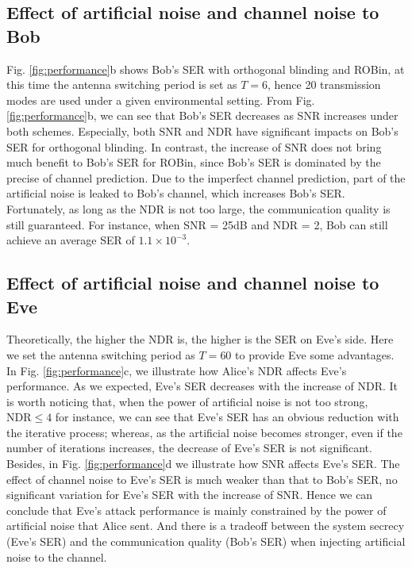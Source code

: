 \subsection{Effect of artificial noise and channel noise to Bob}
Fig. \ref{fig:performance}b shows Bob's SER with orthogonal blinding and ROBin, at this time the antenna switching period is set as $T = 6$, hence 20 transmission modes are used under a given environmental setting. From Fig. \ref{fig:performance}b, we can see that Bob's SER decreases as SNR increases under both schemes. Especially, both SNR and NDR have significant impacts on Bob's SER for orthogonal blinding. In contrast, the increase of SNR does not bring much benefit to Bob's SER for ROBin, since Bob's SER is dominated by the precise of channel prediction. Due to the imperfect channel prediction, part of the artificial noise is leaked to Bob's channel, which increases Bob's SER. Fortunately, as long as the NDR is not too large, the communication quality is still guaranteed. For instance, when SNR = 25dB and NDR = 2, Bob can still achieve an average SER of $1.1 \times 10^{-3}$. 

\subsection{Effect of artificial noise and channel noise to Eve}
Theoretically, the higher the NDR is, the higher is the SER on Eve's side. Here we set the antenna switching period as $T = 60$ to provide Eve some advantages. In Fig. \ref{fig:performance}c, we illustrate how Alice's NDR affects Eve's performance. As we expected, Eve's SER decreases with the increase of NDR. It is worth noticing that, when the power of artificial noise is not too strong, $\text{NDR} \leq 4$ for instance, we can see that Eve's SER has an obvious reduction with the iterative process; whereas, as the artificial noise becomes stronger, even if the number of iterations increases, the decrease of Eve's SER is not significant. 
Besides, in Fig. \ref{fig:performance}d we illustrate how SNR affects Eve's SER. The effect of channel noise to Eve's SER is much weaker than that to Bob's SER, no significant variation for Eve's SER with the increase of SNR. Hence we can conclude that Eve's attack performance is mainly constrained by the power of artificial noise that Alice sent. And there is a tradeoff between the system secrecy (Eve's SER) and the communication quality (Bob's SER) when injecting artificial noise to the channel.


